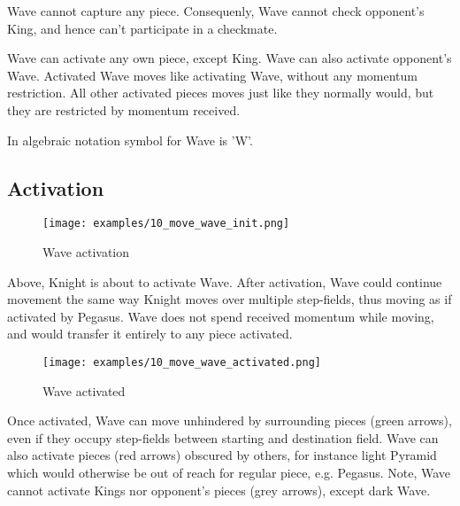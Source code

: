 Wave cannot capture any piece. Consequenly, Wave cannot check opponent's
King, and hence can't participate in a checkmate.

Wave can activate any own piece, except King. Wave can also activate
opponent's Wave. Activated Wave moves like activating Wave, without any
momentum restriction. All other activated pieces moves just like they
normally would, but they are restricted by momentum received.

In algebraic notation symbol for Wave is 'W'.

\clearpage %

\subsection*{Activation}

\noindent
\begin{figure}[h]
\texttt{[image: examples/10\_move\_wave\_init.png]}
\caption{Wave activation}
\label{fig:wave_activation}
\end{figure}

Above, Knight is about to activate Wave. After activation, Wave could
continue movement the same way Knight moves over multiple step-fields,
thus moving as if activated by Pegasus. Wave does not spend received
momentum while moving, and would transfer it entirely to any piece
activated.

\clearpage %

\noindent
\begin{figure}[h]
\texttt{[image: examples/10\_move\_wave\_activated.png]}
\caption{Wave activated}
\label{fig:wave_activated}
\end{figure}

Once activated, Wave can move unhindered by surrounding pieces (green arrows),
even if they occupy step-fields between starting and destination field. Wave
can also activate pieces (red arrows) obscured by others, for instance light
Pyramid which would otherwise be out of reach for regular piece, e.g. Pegasus.
Note, Wave cannot activate Kings nor opponent's pieces (grey arrows), except
dark Wave.

\clearpage %

